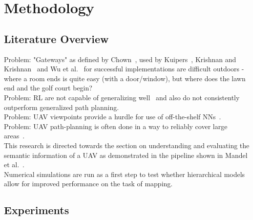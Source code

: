 \documentclass[twocolumn,letterpaper]{IEEEAerospaceCLS}  %
\begin{document}
\section{Methodology} \label{sec:Met}
\subsection{Literature Overview}
Problem: "Gateways" as defined by Chown~\cite{chown_prototypes_1995}, used by Kuipers~\cite{kuipers_local_2004}, Krishnan and Krishnan~\cite{krishnan_visual_2010} and Wu et al.~\cite{wu_learning_2018} for successful implementations are difficult outdoors - where a room ends is quite easy (with a door/window), but where does the lawn end and the golf court begin?\\
Problem: RL are not capable of generalizing well~\cite{chaplot_object_2020} and also do not consistently outperform generalized path planning.\\
Problem: UAV viewpoints provide a hurdle for use of off-the-shelf NNs~\cite{richardwebster_psyphy:_2019}.\\
Problem: UAV path-planning is often done in a way to reliably cover large areas~\cite{vanegas_novel_2018}.\\
This research is directed towards the section on understanding and evaluating the semantic information of a UAV as demonstrated in the pipeline shown in Mandel et al.~\cite{mandel_towards_2020}.\\
Numerical simulations are run as a first step to test whether hierarchical models allow for improved performance on the task of mapping.
\subsection{Experiments} \label{subsec:MetEx}
\end{document}
